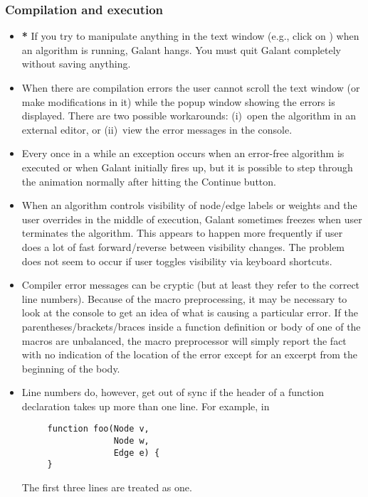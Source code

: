 \subsubsection*{Compilation and execution}

\begin{itemize}

\item \textbf{*}
  If you try to manipulate anything in the text window (e.g., click on
  ) when an algorithm is running, Galant hangs. You must quit
  Galant completely without saving anything.
  
\item
  When there are compilation errors the user cannot scroll the text window
  (or make modifications in it) while the popup window showing the errors is
  displayed. There are two possible workarounds: (i)~open the algorithm in an
  external editor, or (ii)~view the error messages in the console.

\item Every once in a while an exception occurs when an error-free algorithm
  is executed or when Galant initially fires up, but it is possible to step
  through the animation normally after hitting the \textsf{Continue} button.

\item When an algorithm controls visibility of node/edge labels or weights
  and the user overrides in the middle of execution, Galant sometimes freezes
  when user terminates the algorithm. This appears to happen more frequently
  if user does a lot of fast forward/reverse between visibility changes. The
  problem does not seem to occur if user toggles visibility via keyboard
  shortcuts.

\item
  Compiler error messages can be cryptic (but at least they refer to the correct
  line numbers). Because of the macro preprocessing,
  it may be necessary to look at the console
  to get an idea of what is causing a particular error.
  If the parentheses/brackets/braces inside a function definition or body of
  one of the  macros are unbalanced, the macro preprocessor
  will simply report the fact with no indication of the location of the error
  except for an excerpt from the beginning of the body.

\item Line numbers do, however, get out of sync if the header of a function
  declaration takes up more than one line. For example, in
\begin{verbatim}
     function foo(Node v,
                  Node w,
                  Edge e) {
     }
\end{verbatim}
The first three lines are treated as one.


\end{itemize}
